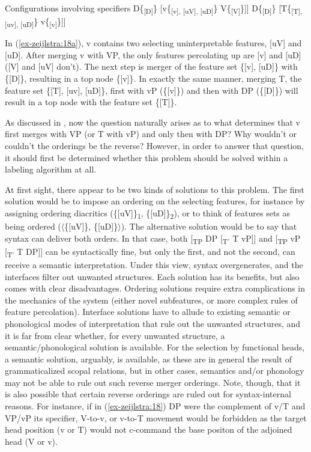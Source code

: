 \documentclass[output=paper
,modfonts
,nonflat]{langsci/langscibook}
\begin{document}
\begin{exe}
	\ex Configurations involving specifiers \label{ex-zeijlstra:18}
		\xlist
		\ex {[}D\{\textsubscript{{[}D{]}}\} \label{ex-zeijlstra:18a} {[}v\{\textsubscript{{[}v{]}, {[}uV{]}, {[}uD{]}}\} V\{\textsubscript{{[}V{]}}\}{]}{]}
		\ex {[}D\{\textsubscript{{[}D{]}}\} {[}T\{\textsubscript{{[}T{]}, {[}uv{]}, {[}uD{]}}\} v\{\textsubscript{{[}v{]}}\}{]}{]}
		\endxlist
	\end{exe}
In (\ref{ex-zeijlstra:18a}), v contains two selecting uninterpretable features, [uV] and [uD]. After merging v with VP, the only features percolating up are [v] and [uD] ([V] and [uV] don’t). The next step is merger of the feature set \{[v], [uD]\} with \{[D]\}, resulting in a top node \{[v]\}. In exactly the same manner, merging T, the feature set \{[T], [uv], [uD]\}, first with vP (\{[v]\}) and then with DP (\{[D]\}) will result in a top node with the feature set \{[T]\}.

As discussed in , now the question naturally arises as to what determines that v first merges with VP (or T with vP) and only then with DP? Why wouldn’t or couldn’t the orderings be the reverse? However, in order to answer that question, it should first be determined whether this problem should be solved within a labeling algorithm at all.

At first sight, there appear to be two kinds of solutions to this problem. The first solution would be to impose an ordering on the selecting features, for instance by assigning ordering diacritics (\{[uV]\}\textsubscript{1}, \{[uD]\}\textsubscript{2}), or to think of features sets as being ordered ($\langle$\{[uV]\}, \{[uD]\}$\rangle$). The alternative solution would be to say that syntax can deliver both orders. In that case, both [\textsubscript{TP} DP [\textsubscript{T’} T vP]] and [\textsubscript{TP} vP [\textsubscript{T’} T DP]] can be syntactically fine, but only the first, and not the second, can receive a semantic interpretation. Under this view, syntax overgenerates, and the interfaces filter out unwanted structures. Each solution has its benefits, but also comes with clear disadvantages. Ordering solutions require extra complications in the mechanics of the system (either novel subfeatures, or more complex rules of feature percolation). Interface solutions have to allude to existing semantic or phonological modes of interpretation that rule out the unwanted structures, and it is far from clear whether, for every unwanted structure, a semantic\slash phonological solution is available. For the selection by functional heads, a semantic solution, arguably, is available, as these are in general the result of grammaticalized scopal relations, but in other cases, semantics and\slash or phonology may not be able to rule out such reverse merger orderings. Note, though, that it is also possible that certain reverse orderings are ruled out for syntax-internal reasons. For instance, if in (\ref{ex-zeijlstra:18}) DP were the complement of v/T and VP/vP its specifier, V-to-v, or v-to-T movement would be forbidden as the target head position (v or T) would not c-command the base positon of the adjoined head (V or v).
\end{document}
